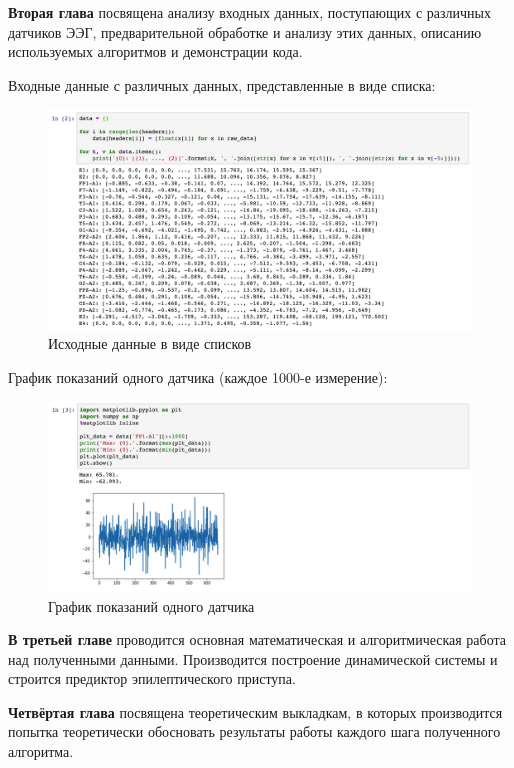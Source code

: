 \documentclass[a4paper,12pt]{report}
\begin{document}
\textbf{Вторая глава} посвящена анализу входных данных, поступающих с различных датчиков ЭЭГ, предварительной обработке и анализу этих данных, описанию используемых алгоритмов и демонстрации кода.

Входные данные с различных данных, представленные в виде списка:

\begin{figure}[h!]
    \centering
    \includegraphics[scale=0.4]{2.png}
    \caption{Исходные данные в виде списков}
\end{figure}

\newpage
График показаний одного датчика (каждое 1000-е измерение):

\begin{figure}[h!]
    \centering
    \includegraphics[scale=0.45]{3.png}
    \caption{График показаний одного датчика}
\end{figure}

\textbf{В третьей главе} проводится основная математическая и алгоритмическая работа над полученными данными. Производится построение динамической системы и строится предиктор эпилептического приступа.

\textbf{Четвёртая глава} посвящена теоретическим выкладкам, в которых производится попытка теоретически обосновать результаты работы каждого шага полученного алгоритма.
\end{document}
